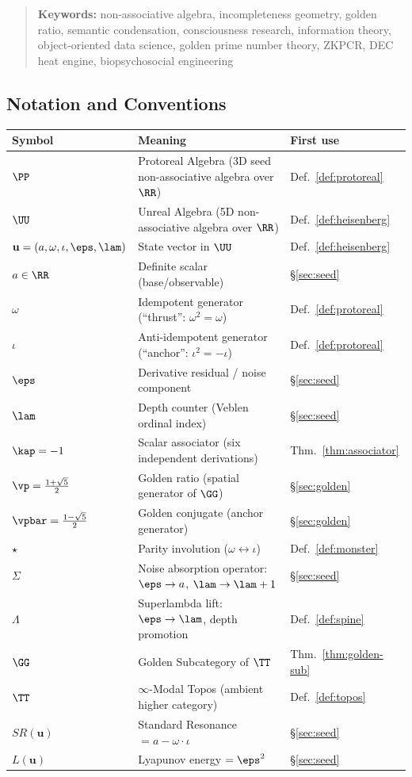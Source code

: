 \begin{quotation}
\medskip\noindent
\textbf{Keywords:} non-associative algebra, incompleteness geometry, golden ratio, semantic condensation, consciousness research, information theory, object-oriented data science, golden prime number theory, ZKPCR, DEC heat engine, biopsychosocial engineering
\end{quotation}

\newpage

\subsection*{Notation and Conventions}

\begin{tabular}{@{}lll@{}}
\toprule
\textbf{Symbol} & \textbf{Meaning} & \textbf{First use} \\
\midrule
$\PP$ & Protoreal Algebra (3D seed non-associative algebra over $\RR$) & Def.~\ref{def:protoreal} \\
$\UU$ & Unreal Algebra (5D non-associative algebra over $\RR$) & Def.~\ref{def:heisenberg} \\
$\mathbf{u} = (a, \omega, \iota, \eps, \lam)$ & State vector in $\UU$ & Def.~\ref{def:heisenberg} \\
$a \in \RR$ & Definite scalar (base/observable) & \S\ref{sec:seed} \\
$\omega$ & Idempotent generator (``thrust'': $\omega^2 = \omega$) & Def.~\ref{def:protoreal} \\
$\iota$ & Anti-idempotent generator (``anchor'': $\iota^2 = -\iota$) & Def.~\ref{def:protoreal} \\
$\eps$ & Derivative residual / noise component & \S\ref{sec:seed} \\
$\lam$ & Depth counter (Veblen ordinal index) & \S\ref{sec:seed} \\
$\kap = -1$ & Scalar associator (six independent derivations) & Thm.~\ref{thm:associator} \\
$\vp = \tfrac{1+\sqrt{5}}{2}$ & Golden ratio (spatial generator of $\GG$) & \S\ref{sec:golden} \\
$\vpbar = \tfrac{1-\sqrt{5}}{2}$ & Golden conjugate (anchor generator) & \S\ref{sec:golden} \\
$\star$ & Parity involution ($\omega \leftrightarrow \iota$) & Def.~\ref{def:monster} \\
$\Sigma$ & Noise absorption operator: $\eps \to a$, $\lam \to \lam+1$ & \S\ref{sec:seed} \\
$\Lambda$ & Superlambda lift: $\eps \to \lam$, depth promotion & Def.~\ref{def:spine} \\
$\GG$ & Golden Subcategory of $\TT$ & Thm.~\ref{thm:golden-sub} \\
$\TT$ & $\infty$-Modal Topos (ambient higher category) & Def.~\ref{def:topos} \\
$SR(\mathbf{u})$ & Standard Resonance $= a - \omega \cdot \iota$ & \S\ref{sec:seed} \\
$L(\mathbf{u})$ & Lyapunov energy $= \eps^2$ & \S\ref{sec:seed} \\
\bottomrule
\end{tabular}


